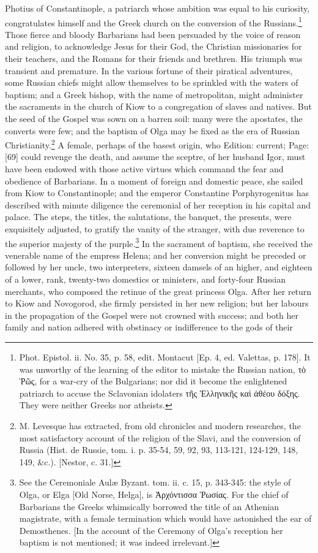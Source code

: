 Photius of Constantinople, a patriarch whose ambition was equal to his curiosity, congratulates himself and the Greek church on the conversion of the Russians.\footnote{Phot. Epistol. ii. No. 35, p. 58, edit. Montacut [Ep. 4, ed. Valettas, p. 178]. It was unworthy of the learning of the editor to mistake the Russian nation, \textgreek{τ\texthebrew{ὸ Ῥῶ}ς}, for a war-cry of the Bulgarians; nor did it become the enlightened patriarch to accuse the Sclavonian idolaters \textgreek{τ\texthebrew{ῆ}ς \texthebrew{Ἐ}λληνικ\texthebrew{ῆ}ς κα\texthebrew{ὶ ἀ}θέου δόξης}. They were neither Greeks nor atheists.} Those fierce and bloody Barbarians had been persuaded by the voice of reason and religion, to acknowledge Jesus for their God, the Christian missionaries for their teachers, and the Romans for their friends and brethren. His triumph was transient and premature. In the various fortune of their piratical adventures, some Russian chiefs might allow themselves to be sprinkled with the waters of baptism; and a Greek bishop, with the name of metropolitan, might administer the sacraments in the church of Kiow to a congregation of slaves and natives. But the seed of the Gospel was sown on a barren soil: many were the apostates, the converts were few; and the baptism of Olga may be fixed as the era of Russian Christianity.\footnote{M. Levesque has extracted, from old chronicles and modern researches, the most satisfactory account of the religion of the Slavi, and the conversion of Russia (Hist. de Russie, tom. i. p. 35-54, 59, 92, 93, 113-121, 124-129, 148, 149, \&c.). [Nestor, c. 31.]} A female, perhaps of the basest origin, who Edition: current; Page: [69] could revenge the death, and assume the sceptre, of her husband Igor, must have been endowed with those active virtues which command the fear and obedience of Barbarians. In a moment of foreign and domestic peace, she sailed from Kiow to Constantinople; and the emperor Constantine Porphyrogenitus has described with minute diligence the ceremonial of her reception in his capital and palace. The steps, the titles, the salutations, the banquet, the presents, were exquisitely adjusted, to gratify the vanity of the stranger, with due reverence to the superior majesty of the purple.\footnote{See the Ceremoniale Aulæ Byzant. tom. ii. c. 15, p. 343-345: the style of Olga, or Elga [Old Norse, Helga], is \textgreek{\texthebrew{Ἀ}ρχόντισσα \texthebrew{Ῥ}ωσίας}. For the chief of Barbarians the Greeks whimsically borrowed the title of an Athenian magistrate, with a female termination which would have astonished the ear of Demosthenes. [In the account of the Ceremony of Olga\texthebrew{}’s reception her baptism is not mentioned; it was indeed irrelevant.]} In the sacrament of baptism, she received the venerable name of the empress Helena; and her conversion might be preceded or followed by her uncle, two interpreters, sixteen damsels of an higher, and eighteen of a lower, rank, twenty-two domestics or ministers, and forty-four Russian merchants, who composed the retinue of the great princess Olga. After her return to Kiow and Novogorod, she firmly persisted in her new religion; but her labours in the propagation of the Gospel were not crowned with success; and both her family and nation adhered with obstinacy or indifference to the gods of their 